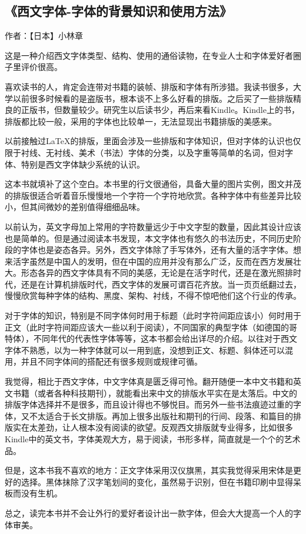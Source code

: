 \subsection{《西文字体-字体的背景知识和使用方法》}

作者：【日本】小林章

这是一种介绍西文字体类型、结构、使用的通俗读物，在专业人士和字体爱好者圈子里评价很高。

喜欢读书的人，肯定会连带对书籍的装帧、排版和字体有所涉猎。我读书很多，大学以前很多时候看的是盗版书，根本谈不上多么好看的排版。之后买了一些排版精良的正版书，但数量较少。研究生以后读书少，再后来看Kindle。Kindle上的书，排版都比较一般，采用的字体也比较单一，无法显现出书籍排版的美感来。

以前接触过\LaTeX 的排版，里面会涉及一些排版和字体知识，但对字体的认识也仅限于衬线、无衬线、美术（书法）字体的分类，以及字重等简单的名词，但对字体、特别是西文字体缺少系统的认识。

这本书就填补了这个空白。本书里的行文很通俗，具备大量的图片实例，图文并茂的排版很适合听着音乐慢慢地一个字符一个字符地欣赏。各种字体中有些差异比较小，但其间微妙的差别值得细细品味。

以前认为，英文字母加上常用的字符数量远少于中文字型的数量，因此其设计应该也是简单的。但是通过阅读本书发现，本文字体也有悠久的书法历史，不同历史阶段的字体也是姿态各异。另外，西文字体除了手写体外，还有大量的活字字体。想来活字虽然是中国人的发明，但在中国的应用并没有那么广泛，反而在西方发展壮大。形态各异的西文字体具有不同的美感，无论是在活字时代，还是在激光照排时代，还是在计算机排版时代，西文字体的发展可谓百花齐放。当一页页纸翻过去，慢慢欣赏每种字体的结构、黑度、架构、衬线，不得不惊吧他们这个行业的传承。

对于字体的知识，特别是不同字体何时用于标题（此时字符间距应该小）何时用于正文（此时字符间距应该大一些以利于阅读），不同国家的典型字体（如德国的哥特体），不同年代的代表性字体等等，这本书都会给出详尽的介绍。以往对于西文字体不熟悉，以为一种字体就可以一用到底，没想到正文、标题、斜体还可以混用，并且不同字体间的搭配还有很多规则或规律可循。

我觉得，相比于西文字体，中文字体真是匮乏得可怜。翻开随便一本中文书籍和英文书籍（或者各种科技期刊），就能看出来中文的排版水平实在是太落后。中文的排版字体选择并不是很多，而且设计得也不够悦目。而另外一些书法痕迹过重的字体，又不太适合于长文排版。再加上很多出版社和期刊的行间、段落、和篇目的排版实在太差劲，让人根本没有阅读的欲望。反观西文排版就专业得多，比如很多Kindle中的英文书，字体美观大方，易于阅读，书形多样，简直就是一个个的艺术品。

但是，这本书我不喜欢的地方：正文字体采用汉仪旗黑，其实我觉得采用宋体是更好的选择。黑体抹除了汉字笔划间的变化，虽然易于识别，但在书籍印刷中显得呆板而没有生机。

总之，读完本书并不会让外行的爱好者设计出一款字体，但会大大提高一个人的字体审美。